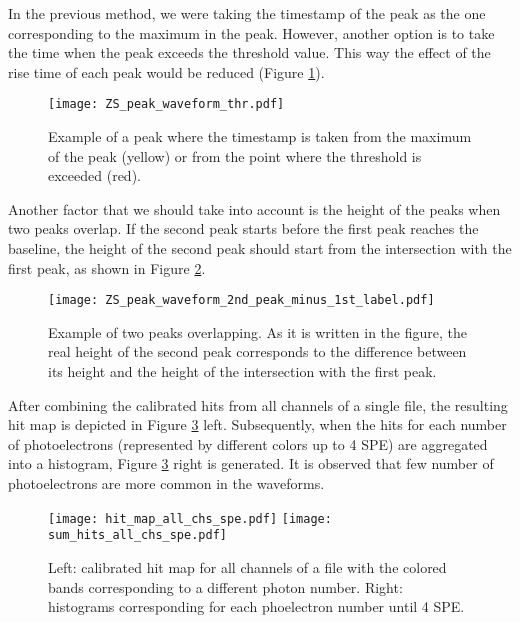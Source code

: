 \documentclass[11pt,a4paper,english,oneside, pdf]{article}
\begin{document}
	In the previous method, we were taking the timestamp of the peak as the one corresponding to the maximum in the peak. However, another option is to take the time when the peak exceeds the threshold value. This way the effect of the rise time of each peak would be reduced (Figure \ref{fig:ZS_peak_waveform_thr}).
	
	\begin{figure}[!h]
		\begin{center}
			\texttt{[image: ZS\_peak\_waveform\_thr.pdf]}
			\caption{Example of a peak where the timestamp is taken from the maximum of the peak (yellow) or from the point where the threshold is exceeded (red).}
			\label{fig:ZS_peak_waveform_thr}
		\end{center}
	\end{figure}
	
	Another factor that we should take into account is the height of the peaks when two peaks overlap. If the second peak starts before the first peak reaches the baseline, the height of the second peak should start from the intersection with the first peak, as shown in Figure \ref{fig:ZS_peak_waveform_2nd_peak_minus_1st}.
	
	\begin{figure}[!h]
		\begin{center}
			\texttt{[image: ZS\_peak\_waveform\_2nd\_peak\_minus\_1st\_label.pdf]}
			\caption{Example of two peaks overlapping. As it is written in the figure, the real height of the second peak corresponds to the difference between its height and the height of the intersection with the first peak.}
			\label{fig:ZS_peak_waveform_2nd_peak_minus_1st}
		\end{center}
	\end{figure}

	
	After combining the calibrated hits from all channels of a single file, the resulting hit map is depicted in Figure \ref{fig:hit_map_all_chs_spe} left. Subsequently, when the hits for each number of photoelectrons (represented by different colors up to 4 SPE) are aggregated into a histogram, Figure \ref{fig:hit_map_all_chs_spe} right is generated. It is observed that few number of photoelectrons are more common in the waveforms.
	
	\begin{figure}[!h]
		\centering
		\texttt{[image: hit\_map\_all\_chs\_spe.pdf]}
		\texttt{[image: sum\_hits\_all\_chs\_spe.pdf]}
		\caption{Left: calibrated hit map for all channels of a file with the colored bands corresponding to a different photon number. Right: histograms corresponding for each phoelectron number until 4 SPE.}
		\label{fig:hit_map_all_chs_spe}
	\end{figure}
	
\end{document}
